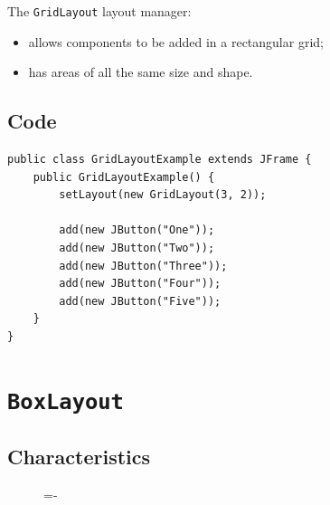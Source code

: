 \documentclass[a4paper]{systems-software}
\begin{document}
The \texttt{GridLayout} layout manager:
\begin{itemize}
	\item allows components to be added in a rectangular grid;
	\item has areas of all the same size and shape.
\end{itemize}


\subsection*{Code}

\begin{lstlisting}[title={A GridLayout class.}]
public class GridLayoutExample extends JFrame {
	public GridLayoutExample() {
		setLayout(new GridLayout(3, 2));
		
		add(new JButton("One"));
		add(new JButton("Two"));
		add(new JButton("Three"));
		add(new JButton("Four"));
		add(new JButton("Five"));
	}
}
\end{lstlisting}


\section*{\texttt{BoxLayout}}

\subsection*{Characteristics}

\begin{figure}[H]
	\lineskip=-\fboxrule
\end{figure}
\end{document}
